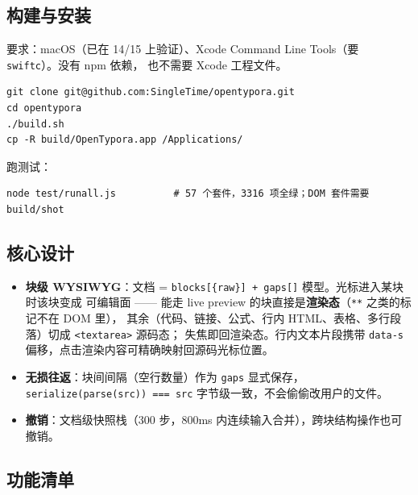 \documentclass[11pt,a4paper]{ctexart}
\begin{document}
\subsection{构建与安装}

要求：macOS（已在 14/15 上验证）、Xcode Command Line Tools（要 \texttt{swiftc}）。没有 npm 依赖，
也不需要 Xcode 工程文件。

\begin{verbatim}
git clone git@github.com:SingleTime/opentypora.git
cd opentypora
./build.sh
cp -R build/OpenTypora.app /Applications/
\end{verbatim}

跑测试：

\begin{verbatim}
node test/runall.js          # 57 个套件，3316 项全绿；DOM 套件需要 build/shot
\end{verbatim}

\subsection{核心设计}

\begin{itemize}
\item \textbf{块级 WYSIWYG}：文档 = \texttt{blocks[\{raw\}] + gaps[]} 模型。光标进入某块时该块变成
可编辑面 —— 能走 live preview 的块直接是\textbf{渲染态}（\texttt{**} 之类的标记不在 DOM 里），
其余（代码、链接、公式、行内 HTML、表格、多行段落）切成 \texttt{\textless{}textarea\textgreater{}} 源码态；
失焦即回渲染态。行内文本片段携带 \texttt{data-s} 偏移，点击渲染内容可精确映射回源码光标位置。
\item \textbf{无损往返}：块间间隔（空行数量）作为 \texttt{gaps} 显式保存，\texttt{serialize(parse(src)) === src}
字节级一致，不会偷偷改用户的文件。
\item \textbf{撤销}：文档级快照栈（300 步，800ms 内连续输入合并），跨块结构操作也可撤销。
\end{itemize}


\subsection{功能清单}
\end{document}

